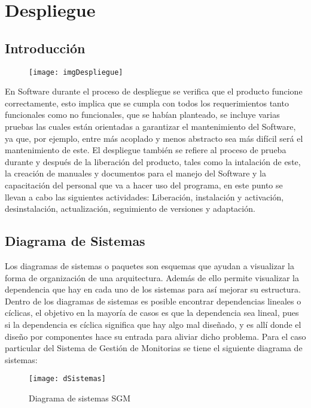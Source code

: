
\chapter{Despliegue}

\section{Introducción}

\begin{figure}[H]
	\centering
	\texttt{[image: imgDespliegue]}
	\centering
\end{figure}

En Software durante el proceso de despliegue se verifica que el producto funcione correctamente, esto implica que se cumpla con todos los requerimientos tanto funcionales como no funcionales, que se habían planteado, se incluye varias pruebas las cuales están orientadas a garantizar el mantenimiento del Software, ya que, por ejemplo, entre más acoplado y menos abstracto sea más difícil será el mantenimiento de este. El despliegue también se refiere al proceso de prueba durante y después de la liberación del producto, tales como la intalación de este, la creación de manuales y documentos para el manejo del Software y la capacitación del personal que va a hacer uso del programa, en este punto se llevan a cabo las siguientes actividades: Liberación, instalación y activación, desinstalación, actualización, seguimiento de versiones y adaptación\cite{Ospina_2012}.
\newpage

\section{Diagrama de Sistemas}

Los diagramas de sistemas o paquetes son esquemas que ayudan a visualizar la forma de organización de una arquitectura. Además de ello permite visualizar la dependencia que hay en cada uno de los sistemas para así mejorar su estructura. Dentro de los diagramas de sistemas es posible encontrar dependencias lineales o cíclicas, el objetivo en la mayoría de casos es que la dependencia sea lineal, pues si la dependencia es cíclica significa que hay algo mal diseñado, y es allí donde el diseño por componentes hace su entrada para aliviar dicho problema. 
Para el caso particular del Sistema de Gestión de Monitorias se tiene el siguiente diagrama de sistemas:

\begin{figure}[H]
	\centering
	\texttt{[image: dSistemas]}
	\centering
	\caption{Diagrama de sistemas SGM}
	\label{fig:dSistemas}
\end{figure}

